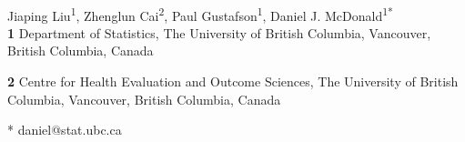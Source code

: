 \documentclass[10pt,letterpaper]{article}
\begin{document}
\vspace*{0.2in}

\begin{flushleft}
{\Large
\textbf{} %
}
\newline
\\
Jiaping Liu\textsuperscript{1},
Zhenglun Cai\textsuperscript{2},
Paul Gustafson\textsuperscript{1},
Daniel J. McDonald\textsuperscript{1*}
\\
\bigskip
\textbf{1} Department of Statistics, The University of British Columbia, Vancouver, British Columbia, Canada

\textbf{2} Centre for Health Evaluation and Outcome Sciences, The University of British Columbia, Vancouver, British Columbia, Canada
\\

\bigskip

% 
%





* daniel@stat.ubc.ca

\end{flushleft}
\end{document}
